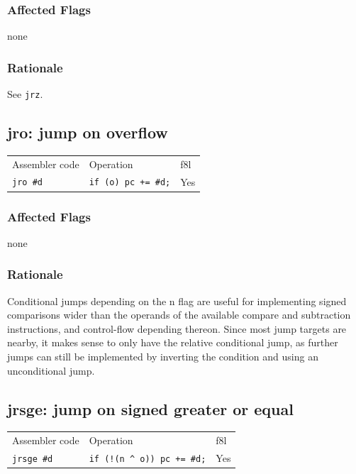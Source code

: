 \documentclass{book}
\begin{document}
\subsubsection*{Affected Flags}

none

\subsubsection*{Rationale}

See \texttt{jrz}.


\subsection{jro: jump on overflow}

\begin{tabular}{l l l}
Assembler code   & Operation                  & f8l \\
\texttt{jro \#d} & \texttt{if (o) pc += \#d;} & Yes \\
\end{tabular}

\subsubsection*{Affected Flags}

none

\subsubsection*{Rationale}

Conditional jumps depending on the n flag are useful for implementing signed comparisons wider than the operands of the available compare and subtraction instructions, and control-flow depending thereon. Since most jump targets are nearby, it makes sense to only have the relative conditional jump, as further jumps can still be implemented by inverting the condition and using an unconditional jump.


\subsection{jrsge: jump on signed greater or equal}

\begin{tabular}{l l l}
Assembler code     & Operation                            & f8l \\
\texttt{jrsge \#d} & \texttt{if (!(n \^{} o)) pc += \#d;} & Yes \\
\end{tabular}
\end{document}
